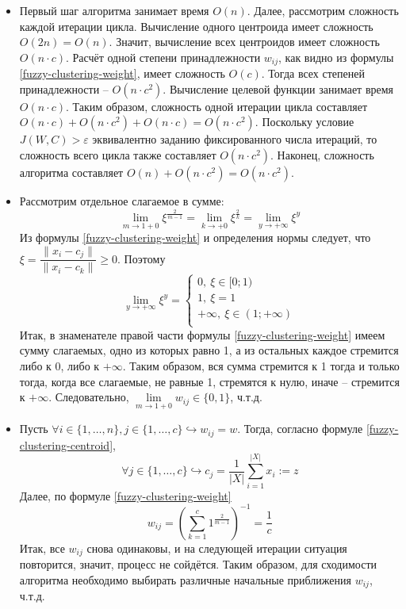 \begin{itemize}
\item Первый шаг алгоритма занимает время $O(n)$. Далее, рассмотрим сложность каждой итерации
цикла. Вычисление одного центроида имеет сложность $O(2n) = O(n)$. Значит, вычисление всех
центроидов имеет сложность $O(n \cdot c)$. Расчёт одной степени принадлежности $w_{ij}$, как
видно из формулы \eqref{fuzzy-clustering-weight}, имеет сложность $O(c)$. Тогда всех
степеней принадлежности -- $O(n \cdot c^2)$. Вычисление целевой функции занимает время
$O(n \cdot c)$. Таким образом, сложность одной итерации цикла составляет
$O(n \cdot c) + O(n \cdot c^2) + O(n \cdot c) = O(n \cdot c^2)$. Поскольку условие
$J(W, C) > \varepsilon$ эквивалентно заданию фиксированного числа итераций, то сложность
всего цикла также составляет $O(n \cdot c^2)$. Наконец, сложность алгоритма составляет
$O(n) + O(n \cdot c^2) = O(n \cdot c^2)$.
\item Рассмотрим отдельное слагаемое в сумме:
\begin{equation*}
    \lim\limits_{m \to 1 + 0} \xi^{\frac{2}{m - 1}} =
    \lim\limits_{k \to +0} \xi^{\frac{2}{k}} =
    \lim\limits_{y \to +\infty} \xi^{y}
\end{equation*}
Из формулы \eqref{fuzzy-clustering-weight} и определения нормы следует, что
$\xi = \dfrac{\lVert x_i - c_j \rVert}{\lVert x_i - c_k \rVert} \geq 0$. Поэтому
\begin{equation*}
    \lim\limits_{y \to +\infty} \xi^{y} =
    \begin{cases}
        0,\ \xi \in [0; 1)             \\
        1,\ \xi = 1                    \\
        +\infty,\ \xi \in (1; +\infty) \\
    \end{cases}
\end{equation*}
Итак, в знаменателе правой части формулы \eqref{fuzzy-clustering-weight} имеем сумму
слагаемых, одно из которых равно 1, а из остальных каждое стремится либо к 0, либо к
$+\infty$. Таким образом, вся сумма стремится к 1 тогда и только тогда, когда все
слагаемые, не равные 1, стремятся к нулю, иначе -- стремится к $+\infty$. Следовательно,
$\lim\limits_{m \to 1 + 0}w_{ij} \in \{0, 1\}$, ч.т.д.
\item Пусть $\forall i \in \{1, \ldots, n\}, j \in \{1, \ldots, c\} \hookrightarrow w_{ij} = w$.
Тогда, согласно формуле \eqref{fuzzy-clustering-centroid},
\begin{equation*}
    \forall j \in \{1, \ldots, c\} \hookrightarrow c_j =
    \frac{1}{|X|}\sum\limits_{i = 1}^{|X|} x_i := z
\end{equation*}
Далее, по формуле \eqref{fuzzy-clustering-weight}
\begin{equation*}
    w_{ij} = \left(\sum\limits_{k = 1}^{c} 1^{\frac{2}{m - 1}}\right)^{-1} = \frac{1}{c}
\end{equation*}
Итак, все $w_{ij}$ снова одинаковы, и на следующей итерации ситуация повторится, значит,
процесс не сойдётся. Таким образом, для сходимости алгоритма необходимо выбирать различные
начальные приближения $w_{ij}$, ч.т.д.
\end{itemize}

